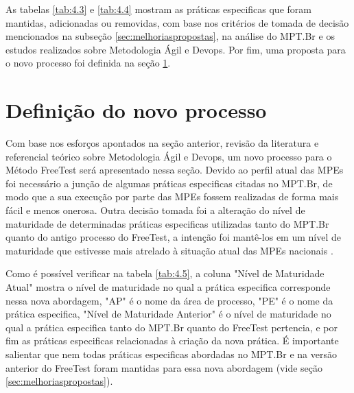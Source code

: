 As tabelas \ref{tab:4.3} e \ref{tab:4.4} mostram as práticas especificas que foram mantidas, adicionadas ou removidas, com base nos critérios de tomada de decisão mencionados na subseção \ref{sec:melhoriaspropostas}, na análise do MPT.Br e os estudos realizados sobre Metodologia Ágil e Devops. Por fim, uma proposta para o novo processo foi definida na seção \ref{sec:novoprocesso}.

\section{Definição do novo processo}
\label{sec:novoprocesso}

Com base nos esforços apontados na seção anterior, revisão da literatura e referencial teórico sobre Metodologia Ágil e Devops, um novo processo para o Método FreeTest será apresentado nessa seção. Devido ao perfil atual das MPEs foi necessário a junção de algumas práticas especificas citadas no MPT.Br, de modo que a sua execução por parte das MPEs fossem realizadas de forma mais fácil e menos onerosa. Outra decisão tomada foi a alteração do nível de maturidade de determinadas práticas especificas utilizadas tanto do MPT.Br quanto do antigo processo do FreeTest, a intenção foi mantê-los em um nível de maturidade que estivesse mais atrelado à situação atual das MPEs nacionais \cite{Especialistas2015, SilvaDias2015}.

Como é possível verificar na tabela \ref{tab:4.5}, a coluna "Nível de Maturidade Atual" mostra o nível de maturidade no qual a prática especifica corresponde nessa nova abordagem, "AP" é o nome da área de processo, "PE" é o nome da prática especifica, "Nível de Maturidade Anterior" é o nível de maturidade no qual a prática especifica tanto do MPT.Br quanto do FreeTest pertencia, e por fim as práticas especificas relacionadas à criação da nova prática. É importante salientar que nem todas práticas especificas abordadas no MPT.Br e na versão anterior do FreeTest foram mantidas para essa nova abordagem (vide seção \ref{sec:melhoriaspropostas}).

